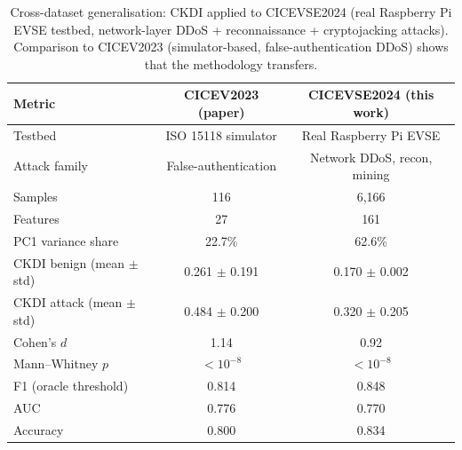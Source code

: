 \begin{table}[t]
\centering
\caption{Cross-dataset generalisation: CKDI applied to CICEVSE2024 (real Raspberry Pi EVSE testbed, network-layer DDoS + reconnaissance + cryptojacking attacks). Comparison to CICEV2023 (simulator-based, false-authentication DDoS) shows that the methodology transfers.}
\label{tab:crossdataset}
\begin{tabular}{lcc}
\toprule
Metric & CICEV2023 (paper) & CICEVSE2024 (this work) \\
\midrule
Testbed & ISO 15118 simulator & Real Raspberry Pi EVSE \\
Attack family & False-authentication & Network DDoS, recon, mining \\
Samples & 116 & 6,166 \\
Features & 27 & 161 \\
PC1 variance share & 22.7\% & 62.6\% \\
\midrule
CKDI benign (mean $\pm$ std) & 0.261 $\pm$ 0.191 & 0.170 $\pm$ 0.002 \\
CKDI attack (mean $\pm$ std) & 0.484 $\pm$ 0.200 & 0.320 $\pm$ 0.205 \\
Cohen's $d$ & 1.14 & 0.92 \\
Mann--Whitney $p$ & $<10^{-8}$ & $<10^{-8}$ \\
\midrule
F1 (oracle threshold) & 0.814 & 0.848 \\
AUC & 0.776 & 0.770 \\
Accuracy & 0.800 & 0.834 \\
\bottomrule
\end{tabular}
\end{table}
